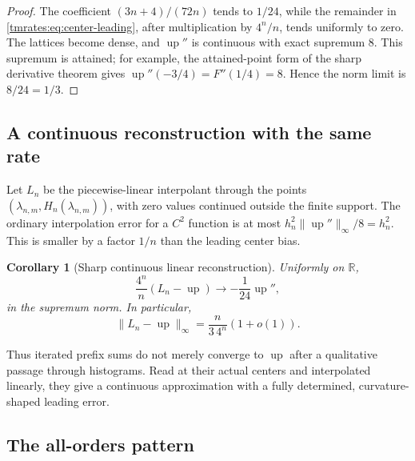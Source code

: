 \documentclass[11pt,oneside]{article}
\newtheorem{corollary}[corollary]{Corollary}
\theoremstyle{definition}
\theoremstyle{remark}
\newcommand{\R}{\mathbb R}
\newcommand{\Up}{\operatorname{up}}
\begin{document}
\begin{proof}
The coefficient $(3n+4)/(72n)$ tends to $1/24$, while the remainder in
\eqref{tmrates:eq:center-leading}, after multiplication by $4^n/n$, tends uniformly to zero.  The
lattices become dense, and $\Up''$ is continuous with exact supremum $8$.  This supremum
is attained; for example, the attained-point form of the sharp derivative theorem gives
$\Up''(-3/4)=F''(1/4)=8$.  Hence the norm limit is $8/24=1/3$.
\end{proof}

\subsection{A continuous reconstruction with the same rate}

Let $L_n$ be the piecewise-linear interpolant through the points
$(\lambda_{n,m},H_n(\lambda_{n,m}))$, with zero values continued outside the finite support.
The ordinary interpolation error for a $C^2$ function is at most
$h_n^2\|\Up''\|_\infty/8=h_n^2$.  This is smaller by a factor $1/n$ than the leading
center bias.

\begin{corollary}[Sharp continuous linear reconstruction]
\label{tmrates:cor:linear-rate}
Uniformly on $\R$,
\begin{equation}
 \frac{4^n}{n}(L_n-\Up)\longrightarrow-\frac1{24}\Up'',   \label{tmrates:eq:linear-profile}
\end{equation}
in the supremum norm.  In particular,
\begin{equation}
 \|L_n-\Up\|_\infty=\frac n{3\,4^n}(1+o(1)).              \label{tmrates:eq:linear-sharp}
\end{equation}
\end{corollary}

Thus iterated prefix sums do not merely converge to $\Up$ after a qualitative passage through
histograms.  Read at their actual centers and interpolated linearly, they give a continuous
approximation with a fully determined, curvature-shaped leading error.

\subsection{The all-orders pattern}
\end{document}

